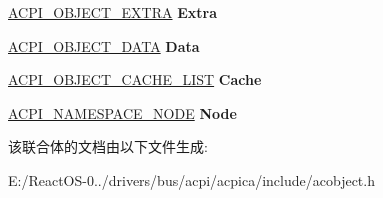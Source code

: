 \begin{DoxyCompactItemize}
\mbox{\label{unionacpi__operand__object_a726a2c2d8ee254c642d2accac6538e9c}} 
\hyperlink{structacpi__object__extra}{A\+C\+P\+I\+\_\+\+O\+B\+J\+E\+C\+T\+\_\+\+E\+X\+T\+RA} {\bfseries Extra}
\item 
\mbox{\label{unionacpi__operand__object_ad405ef582cf151711354a3ab2bf3ad27}} 
\hyperlink{structacpi__object__data}{A\+C\+P\+I\+\_\+\+O\+B\+J\+E\+C\+T\+\_\+\+D\+A\+TA} {\bfseries Data}
\item 
\mbox{\label{unionacpi__operand__object_a7e635ee5c7d0c347458f46b141c8e3ca}} 
\hyperlink{structacpi__object__cache__list}{A\+C\+P\+I\+\_\+\+O\+B\+J\+E\+C\+T\+\_\+\+C\+A\+C\+H\+E\+\_\+\+L\+I\+ST} {\bfseries Cache}
\item 
\mbox{\label{unionacpi__operand__object_a7386cc26bcab3590dbbc5876cf51b270}} 
\hyperlink{structacpi__namespace__node}{A\+C\+P\+I\+\_\+\+N\+A\+M\+E\+S\+P\+A\+C\+E\+\_\+\+N\+O\+DE} {\bfseries Node}
\end{DoxyCompactItemize}


该联合体的文档由以下文件生成\+:\begin{DoxyCompactItemize}
\item 
E\+:/\+React\+O\+S-\/0../drivers/bus/acpi/acpica/include/acobject.\+h\end{DoxyCompactItemize}
